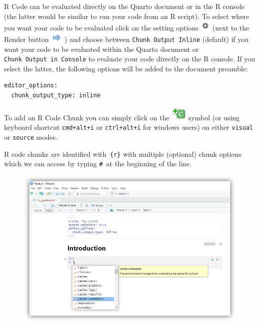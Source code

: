 \documentclass[
  letterpaper,
  DIV=11,
  numbers=noendperiod]{scrartcl}
\begin{document}
R Code can be evaluated directly on the Quarto document or in the R
console (the latter would be similar to run your code from an R script).
To select where you want your code to be evaluated click on the setting
options
\includegraphics[width=0.19792in,height=\textheight]{images/settings.png}
(next to the Render button
\includegraphics[width=0.22917in,height=\textheight]{images/rstudio-render-button.png}
) and choose between \texttt{Chunk\ Output\ Inline} (default) if you
want your code to be evaluated within the Quarto document or
\texttt{Chunk\ Output\ in\ Console} to evaluate your code directly on
the R console. If you select the latter, the following options will be
added to the document preamble:

\begin{verbatim}
editor_options: 
  chunk_output_type: inline
\end{verbatim}

To add an R Code Chunk you can simply click on the
\includegraphics[width=0.30208in,height=\textheight]{images/chunk.png}
symbol (or using keyboard shortcut \texttt{cmd+alt+i} or
\texttt{ctrl+alt+i} for windows users) on either \texttt{visual} or
\texttt{source} modes.

R code chunks are identified with~\texttt{\{r\}} with multiple
(optional) chunk options which we can access by typing
\texttt{\#\textbar{}}~at the beginning of the line.

\begin{figure}

{\centering \includegraphics[width=5.05208in,height=\textheight]{images/quarto6.png}

}

\end{figure}
\end{document}
